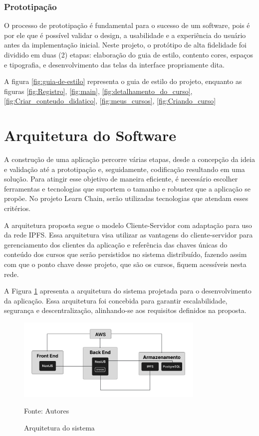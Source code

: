         \subsubsection{Prototipação}

        O processo de prototipação é fundamental para o sucesso de um software, pois é por ele que é possível validar o design, a usabilidade e a experiência do usuário antes da implementação inicial. Neste projeto, o protótipo de alta fidelidade foi dividido em duas (2) etapas: elaboração do guia de estilo, contento cores, espaços e tipografia, e desenvolvimento das telas da interface propriamente dita. 

        A figura \ref{fig:guia-de-estilo} representa o guia de estilo do projeto, enquanto as figuras \ref{fig:Registro}, \ref{fig:main}, \ref{fig:detalhamento_do_curso}, \ref{fig:Criar_conteudo_didatico}, \ref{fig:meus_cursos}, \ref{fig:Criando_curso}

\section{Arquitetura do Software}
A construção de uma aplicação percorre várias etapas, desde a concepção da ideia e validação até a prototipação e, seguidamente, codificação resultando em uma solução. Para atingir esse objetivo de maneira eficiente, é necessário escolher ferramentas e tecnologias que suportem  o tamanho e robustez que a aplicação se propõe. No projeto Learn Chain, serão utilizadas tecnologias que atendam esses critérios.

A arquitetura proposta segue o modelo Cliente-Servidor com adaptação para uso da rede IPFS. Essa arquitetura visa utilizar as vantagens do cliente-servidor para gerenciamento dos clientes da aplicação e referência das chaves únicas do conteúdo dos cursos que serão persistidos no sistema distribuído, fazendo assim com que o ponto chave desse projeto, que são os cursos, fiquem acessíveis nesta rede.

A Figura \ref{fig:arquitetura_sistema} apresenta a arquitetura do sistema projetada para o desenvolvimento da aplicação. Essa arquitetura foi concebida para garantir escalabilidade, segurança e descentralização, alinhando-se aos requisitos definidos na proposta.

\begin{figure}[h]
    \centering
    \caption{Arquitetura do sistema}
    \includegraphics[width=0.8\textwidth]{figuras/arquitetura.png}
    \begin{center}
        {\footnotesize Fonte: Autores}
    \end{center}
    \label{fig:arquitetura_sistema}
\end{figure}

